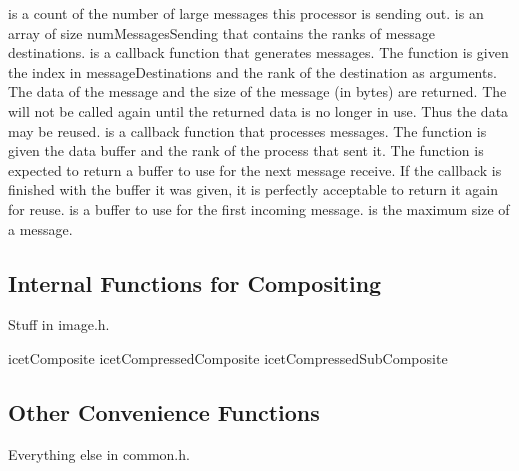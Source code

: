  is a count of the number of large messages this
processor is sending out.   is an array of size
numMessagesSending that contains the ranks of message destinations.
 is a callback function that generates messages.
The function is given the index in messageDestinations and the rank of the
destination as arguments.  The data of the message and the size of the
message (in bytes) are returned.  The  will not be
called again until the returned data is no longer in use.  Thus the data
may be reused.   is a callback function that processes
messages.  The function is given the data buffer and the rank of the
process that sent it.  The function is expected to return a buffer to use
for the next message receive.  If the callback is finished with the buffer
it was given, it is perfectly acceptable to return it again for reuse.
 is a buffer to use for the first incoming message.
 is the maximum size of a message.

\subsection{Internal Functions for Compositing}

Stuff in image.h.

icetComposite
icetCompressedComposite
icetCompressedSubComposite

\subsection{Other Convenience Functions}

Everything else in common.h.

